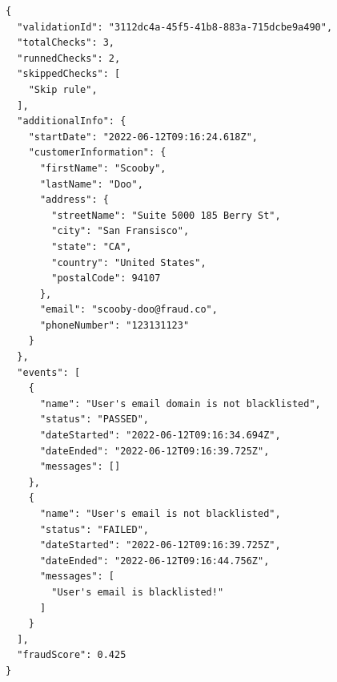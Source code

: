 \begin{lstlisting}[caption={Validation result example (JSON)}]
{
  "validationId": "3112dc4a-45f5-41b8-883a-715dcbe9a490",
  "totalChecks": 3,
  "runnedChecks": 2,
  "skippedChecks": [
    "Skip rule",
  ],
  "additionalInfo": {
    "startDate": "2022-06-12T09:16:24.618Z",
    "customerInformation": {
      "firstName": "Scooby",
      "lastName": "Doo",
      "address": {
        "streetName": "Suite 5000 185 Berry St",
        "city": "San Fransisco",
        "state": "CA",
        "country": "United States",
        "postalCode": 94107
      },
      "email": "scooby-doo@fraud.co",
      "phoneNumber": "123131123"
    }
  },
  "events": [
    {
      "name": "User's email domain is not blacklisted",
      "status": "PASSED",
      "dateStarted": "2022-06-12T09:16:34.694Z",
      "dateEnded": "2022-06-12T09:16:39.725Z",
      "messages": []
    },
    {
      "name": "User's email is not blacklisted",
      "status": "FAILED",
      "dateStarted": "2022-06-12T09:16:39.725Z",
      "dateEnded": "2022-06-12T09:16:44.756Z",
      "messages": [
        "User's email is blacklisted!"
      ]
    }
  ],
  "fraudScore": 0.425  
}
\end{lstlisting}